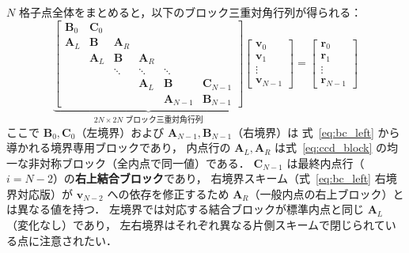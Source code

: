 $N$ 格子点全体をまとめると，以下のブロック三重対角行列が得られる：
\begin{equation}
  \underbrace{
  \begin{bmatrix}
    \mathbf{B}_0 & \mathbf{C}_0 & & & \\
    \mathbf{A}_L & \mathbf{B} & \mathbf{A}_R & & \\
    & \mathbf{A}_L & \mathbf{B} & \mathbf{A}_R & \\
    & & \ddots & \ddots & \ddots \\
    & & & \mathbf{A}_L & \mathbf{B} & \mathbf{C}_{N-1} \\
    & & & & \mathbf{A}_{N-1} & \mathbf{B}_{N-1}
  \end{bmatrix}
  }_{\text{$2N \times 2N$ ブロック三重対角行列}}
  \begin{bmatrix} \bm{v}_0 \\ \bm{v}_1 \\ \vdots \\ \bm{v}_{N-1} \end{bmatrix}
  =
  \begin{bmatrix} \mathbf{r}_0 \\ \mathbf{r}_1 \\ \vdots \\ \mathbf{r}_{N-1} \end{bmatrix}
  \label{eq:ccd_global}
\end{equation}
ここで $\mathbf{B}_0, \mathbf{C}_0$（左境界）および $\mathbf{A}_{N-1}, \mathbf{B}_{N-1}$（右境界）は
式~\eqref{eq:bc_left} から導かれる境界専用ブロックであり，
内点行の $\mathbf{A}_L, \mathbf{A}_R$ は式~\eqref{eq:ccd_block} の均一な非対称ブロック（全内点で同一値）である．
$\mathbf{C}_{N-1}$ は最終内点行（$i=N-2$）の\textbf{右上結合ブロック}であり，
右境界スキーム（式~\eqref{eq:bc_left} 右境界対応版）が $\bm{v}_{N-2}$ への依存を修正するため
$\mathbf{A}_R$（一般内点の右上ブロック）とは異なる値を持つ．
左境界では対応する結合ブロックが標準内点と同じ $\mathbf{A}_L$（変化なし）であり，
左右境界はそれぞれ異なる片側スキームで閉じられている点に注意されたい．

